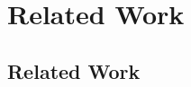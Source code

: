 \chapter{Related Work}
\label{sec:related-work}

\section{Related Work}
\label{sec:related-work}











